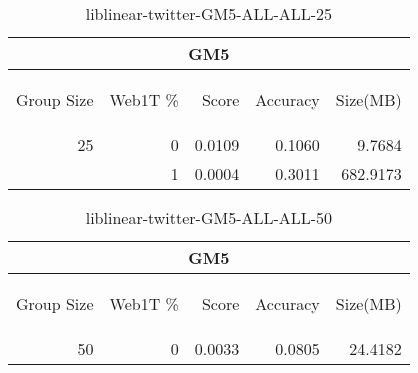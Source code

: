 \begin{center}
\begin{table}[htbp] 
 \begin{center}
\begin{tabular}{ | r | r | r | r | r |}
\hline
\multicolumn{5}{|c|}{GM5}\\
\hline
\begin{sideways}Group Size\end{sideways} & \begin{sideways}Web1T \%\end{sideways} & \begin{sideways}Score\end{sideways} & \begin{sideways}Accuracy\end{sideways} & \begin{sideways}Size(MB)\end{sideways}\\
\hline
\multirow{1}{*}{25}
 & 0 & 0.0109 & 0.1060 & 9.7684\\ \cline{2-5}
 & 1 & 0.0004 & 0.3011 & 682.9173\\ \cline{2-5}
\hline
\end{tabular}
\caption{liblinear-twitter-GM5-ALL-ALL-25}
\label{table:liblinear-twitter-GM5-ALL-ALL-25}
\end{center}
 \end{table}
\end{center}

\begin{center}
\begin{table}[htbp] 
 \begin{center}
\begin{tabular}{ | r | r | r | r | r |}
\hline
\multicolumn{5}{|c|}{GM5}\\
\hline
\begin{sideways}Group Size\end{sideways} & \begin{sideways}Web1T \%\end{sideways} & \begin{sideways}Score\end{sideways} & \begin{sideways}Accuracy\end{sideways} & \begin{sideways}Size(MB)\end{sideways}\\
\hline
\multirow{0}{*}{50}
 & 0 & 0.0033 & 0.0805 & 24.4182\\ \cline{2-5}
\hline
\end{tabular}
\caption{liblinear-twitter-GM5-ALL-ALL-50}
\label{table:liblinear-twitter-GM5-ALL-ALL-50}
\end{center}
 \end{table}
\end{center}

